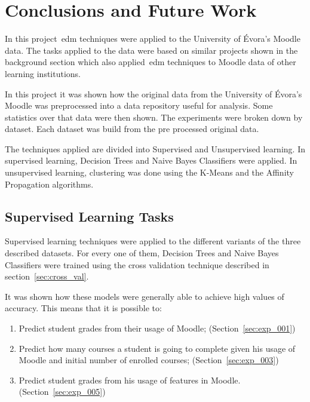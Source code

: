 \chapter{Conclusions and Future Work}
\label{sec:final}

In this project~\gls{edm} techniques were applied to the University of Évora's
Moodle data. The tasks applied to the data were based on similar projects shown
in the background section which also applied~\gls{edm} techniques to Moodle
data of other learning institutions.

In this project it was shown how the original data from the University of
Évora's Moodle was preprocessed into a data repository useful for analysis.
Some statistics over that data were then shown. The experiments were broken
down by dataset. Each dataset was build from the pre processed original data.

The techniques applied are divided into Supervised and Unsupervised learning.
In supervised learning, Decision Trees and Naive Bayes Classifiers were
applied. In unsupervised learning, clustering was done using the K-Means and
the Affinity Propagation algorithms.

\section{Supervised Learning Tasks}

Supervised learning techniques were applied to the different variants of the
three described datasets. For every one of them, Decision Trees and Naive Bayes
Classifiers were trained using the cross validation technique described in
section~\ref{sec:cross_val}.

It was shown how these models were generally able to achieve high values of
accuracy. This means that it is possible to:

\begin{enumerate}
    \item Predict student grades from their usage of Moodle;
        (Section~\ref{sec:exp_001})
    \item Predict how many courses a student is going to complete given his
        usage of Moodle and initial number of enrolled courses;
        (Section~\ref{sec:exp_003})
    \item Predict student grades from his usage of features in Moodle.
        (Section~\ref{sec:exp_005})
\end{enumerate}

